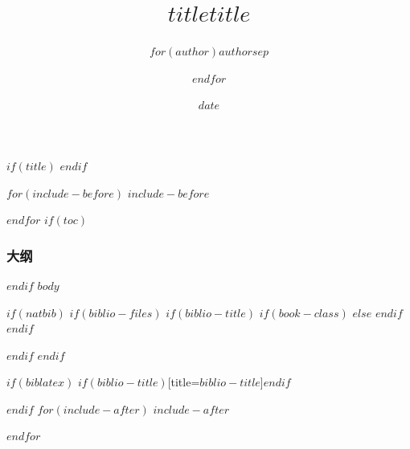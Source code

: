 \documentclass[$if(fontsize)$$fontsize$,$endif$$if(handout)$handout,$endif$$if(beamer)$ignorenonframetext,$endif$]{$documentclass$}
\title[$shorttitle$]{$title$}
\title{$title$}
\author{$for(author)$$author$$sep$ \and $endfor$}
\date{$date$}
\institute[SupStat]{
SupStat\\
\hurl{http://supstat.com}
}
\begin{document}
$if(title)$
  \frame{\titlepage}
$endif$
 
$for(include-before)$
$include-before$
 
$endfor$
$if(toc)$
\begin{frame}\frametitle{大纲}
\tableofcontents[hideallsubsections]
\end{frame}
 
$endif$
$body$
 
$if(natbib)$
  $if(biblio-files)$
    $if(biblio-title)$
      $if(book-class)$
        \renewcommand\bibname{$biblio-title$}
      $else$
        \renewcommand\refname{$biblio-title$}
      $endif$
    $endif$
      
 
  $endif$
$endif$

$if(biblatex)$
  \printbibliography$if(biblio-title)$[title=$biblio-title$]$endif$
 
$endif$
$for(include-after)$
  $include-after$
 
$endfor$
\end{document}
